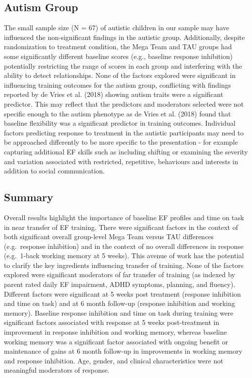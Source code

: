 \documentclass[
  letterpaper,
]{ut-thesis}
\begin{document}
\subsection{Autism Group}\label{autism-group-1}

The small sample size (N = 67) of autistic children in our sample may
have influenced the non-significant findings in the autistic group.
Additionally, despite randomization to treatment condition, the Mega
Team and TAU groups had some significantly different baseline scores
(e.g., baseline response inhibition) potentially restricting the range
of scores in each group and interfering with the ability to detect
relationships. None of the factors explored were significant in
influencing training outcomes for the autism group, conflicting with
findings reported by de Vries et al. (2018) showing autism traits were a
significant predictor. This may reflect that the predictors and
moderators selected were not specific enough to the autism phenotype as
de Vries et al. (2018) found that baseline flexibility was a significant
predictor in training outcomes. Individual factors predicting response
to treatment in the autistic participants may need to be approached
differently to be more specific to the presentation - for example
capturing additional EF skills such as including shifting or examining
the severity and variation associated with restricted, repetitive,
behaviours and interests in addition to social communication.

\subsection{Summary}\label{summary}

Overall results highlight the importance of baseline EF profiles and
time on task in near transfer of EF training. There were significant
factors in the context of both significant overall group-level Mega Team
versus TAU differences (e.g.~response inhibition) and in the context of
no overall differences in response (e.g.~1-back working memory at 5
weeks). This avenue of work has the potential to clarify the key
ingredients influencing transfer of training. None of the factors
explored were significant moderators of far transfer of training (as
indexed by parent rated daily EF impairment, ADHD symptoms, planning,
and fluency). Different factors were significant at 5 weeks post
treatment (response inhibition and time on task) and at 6 month
follow-up (response inhibition and working memory). Baseline response
inhibition and time on task during training were significant factors
associated with response at 5 weeks post-treatment in improvement in
response inhibition and working memory, whereas baseline working memory
was a significant factor associated with ongoing benefit or maintenance
of gains at 6 month follow-up in improvements in working memory and
response inhibition. Age, gender, and clinical characteristics were not
meaningful moderators of response.
\end{document}
